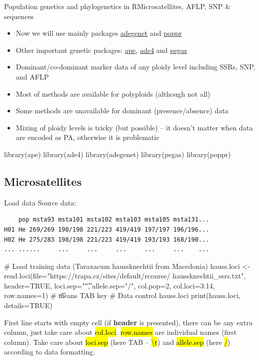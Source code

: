 \documentclass[compress, ucs, xelatex, 11pt, xcolor=svgnames,
  hyperref={
    bookmarks=true,
    unicode=true,
    colorlinks=true,
    pdftitle={Molecular data in R},
    plainpages=false,
    pdfauthor={Vojtech Zeisek},
    pdfsubject={Course about phylogeny and evolution in R},
    pdfcreator={XeLaTeX},
    pdfkeywords={R, evolution, phylogeny, molecular data},
    linkcolor=Tomato,
    anchorcolor=SaddleBrown,
    citecolor=Goldenrod,
    filecolor=DarkMagenta,
    menucolor=Sienna,
    urlcolor=DarkTurquoise,
    pdftex},
  url={hyphens, lowtilde} %
  ]{beamer}
\renewcommand{\texttt}[1]{\hl{\ttfamily #1}}
\begin{document}
\begin{frame}[fragile]{Population genetics and phylogenetics in R}{Microsatellites, AFLP, SNP \& sequences}
\begin{multicols}{2}
  \begin{itemize}
    \item Now we will use mainly packages \href{http://adegenet.r-forge.r-project.org/}{adegenet} and \href{http://grunwaldlab.cgrb.oregonstate.edu/poppr-r-package-population-genetics}{poppr}
    \item Other important genetic packages: \href{http://ape-package.ird.fr/}{ape}, \href{http://pbil.univ-lyon1.fr/ADE-4/}{ade4} and \href{http://ape-package.ird.fr/pegas.html}{pegas}
    \item Dominant/co-dominant marker data of any ploidy level including SSRs, SNP, and AFLP
    \item Most of methods are available for polyploids (although not all)
    \item Some methods are unavailable for dominant (presence/absence) data
    \item Mixing of ploidy levels is tricky (but possible) -- it doesn't matter when data are encoded as PA, otherwise it is problematic
  \end{itemize}
  \begin{spluscode}
    library(ape)
    library(ade4)
    library(adegenet)
    library(pegas)
    library(poppr)
  \end{spluscode}
\end{multicols}
\end{frame}

\subsection{Microsatellites}

\begin{frame}[fragile]{Load data}
Source data:
\begin{verbatim}
    pop msta93 msta101 msta102 msta103 msta105 msta131...
H01 He 269/269 198/198 221/223 419/419 197/197 196/196...
H02 He 275/283 198/198 221/223 419/419 193/193 168/190...
... ......     ...     ...     ...     ...     ...    ...
\end{verbatim}
  \begin{spluscode}
    # Load training data (Taraxacum haussknechtii from Macedonia)
    hauss.loci <- read.loci(file="https://trapa.cz/sites/default/rcourse/
      haussknechtii_ssrs.txt", header=TRUE, loci.sep="\t", allele.sep="/",
      col.pop=2, col.loci=3:14, row.names=1) # \t means TAB key
    # Data control
    hauss.loci
    print(hauss.loci, details=TRUE)
  \end{spluscode}
\begin{footnotesize}
  First line starts with empty cell (if \textbf{header} is presented), there can be any extra column, just take care about \texttt{col.loci}. \texttt{row.names} are individual names (first column). Take care about \texttt{loci.sep} (here TAB -- \texttt{\textbackslash t}) and \texttt{allele.sep} (here \texttt{/}) according to data formatting.
\end{footnotesize}
\end{frame}
\end{document}
